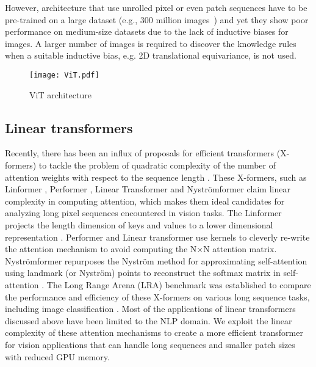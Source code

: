 \documentclass{article}
\begin{document}
However, architecture that use unrolled pixel or even patch sequences have to be pre-trained on a large dataset (e.g., 300 million images~\cite{dosovitskiy2021image}) and yet they show poor performance on medium-size datasets due to the lack of inductive biases for images. A larger number of images is required to discover the knowledge rules when a suitable inductive bias, e.g. 2D translational equivariance, is not used.




\begin{figure}[h]
\centering
\texttt{[image: ViT.pdf]}
\caption{ViT architecture}
\label{fig:x ViT}
\end{figure}




\subsection{Linear transformers}

Recently, there has been an influx of proposals for efficient transformers (X-formers) to tackle the problem of quadratic complexity of the number of attention weights with respect to the sequence length \cite{tay2020efficient}. These X-formers, such as Linformer \cite{wang2020linformer}, Performer  \cite{choromanski2021rethinking}, Linear Transformer \cite{katharopoulos2020transformers} and Nyströmformer \cite{xiong2021nystromformer} claim linear complexity in computing attention, which makes them ideal candidates for analyzing long pixel sequences encountered in vision tasks. The Linformer projects the length dimension of keys and values to a lower dimensional representation \cite{wang2020linformer}. Performer \cite{choromanski2021rethinking} and Linear transformer \cite{katharopoulos2020transformers} use kernels to cleverly re-write the attention mechanism to avoid computing the N×N attention matrix. Nyströmformer repurposes the Nyström method for approximating self-attention using landmark (or Nyström) points to reconstruct the softmax matrix in self-attention \cite{xiong2021nystromformer}. The Long Range Arena (LRA) benchmark was established to compare the performance and efficiency of these X-formers on various long sequence tasks, including image classification \cite{tay2020long}.
Most of the applications of linear transformers discussed above have been limited to the NLP domain. We exploit the linear complexity of these attention mechanisms to create a more efficient transformer for vision applications that can handle long sequences and smaller patch sizes with reduced GPU memory. 
\end{document}
